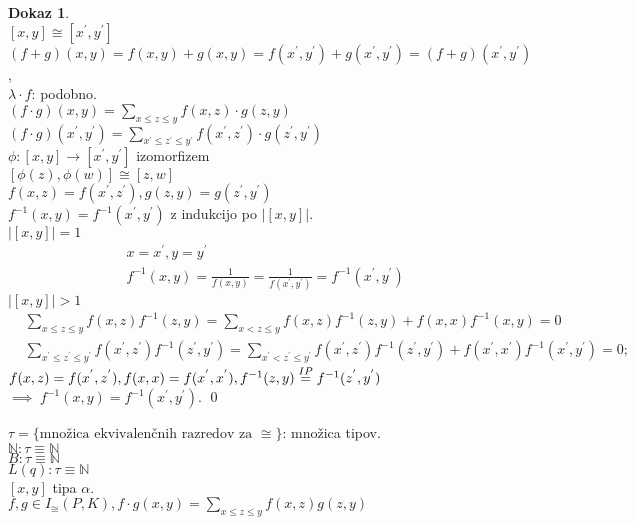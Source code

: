 \documentclass[a4paper, 12pt]{book}
\theoremstyle{definition}
\newtheorem{pro}[counter]{Dokaz}
\theoremstyle{remark}
\newcommand{\N}{\mathbb{N}}
\begin{document}
\begin{pro} \text{} \\
  $[x, y] \cong [x^{'}, y^{'}]$ \\
  $(f+g)(x,y) = f(x,y) + g(x,y) = f(x^{'}, y^{'}) + g(x^{'}, y^{'}) = (f+g)(x^{'}, y^{'})$, \\
  $\lambda \cdot f$: podobno. \\
  $(f \cdot g) (x, y) = \sum_{x \leq z \leq y} f(x, z) \cdot g(z, y)$ \\
  $(f \cdot g) (x^{'}, y^{'}) = \sum_{x^{'} \leq z^{'} \leq y^{'}} f(x^{'}, z^{'}) \cdot g(z^{'}, y^{'})$ \\
  $\phi: [x, y] \to [x^{'}, y^{'}]$ izomorfizem \\
  $[\phi(z), \phi(w)] \cong [z, w]$ \\
  $f(x, z) = f(x^{'}, z^{'}), g(z, y) = g(z^{'}, y^{'})$ \\
  $f^{-1}(x,y) = f^{-1}(x^{'}, y^{'})$ z indukcijo po $\left|[x,y]\right|$. \\
  $\left|[x,y]\right| = 1$
  \begin{align*}
    &x = x^{'}, y = y^{'} \\
    &f^{-1}(x,y) = \frac{1}{f(x,y)} = \frac{1}{f(x^{'}, y^{'})} = f^{-1}(x^{'}, y^{'})
  \end{align*}
  $\left|[x,y]\right| > 1$
  \begin{align*}
    &\sum_{x \leq z \leq y} f(x,z) f^{-1}(z,y) = \sum_{x < z \leq y} f(x,z) f^{-1}(z,y) + f(x,x) f^{-1}(x,y) = 0 \\
    &\sum_{x^{'} \leq z^{'} \leq y^{'}} f(x^{'},z^{'}) f^{-1}(z^{'},y^{'}) =
      \sum_{x^{'} < z^{'} \leq y^{'}} f(x^{'},z^{'}) f^{-1}(z^{'},y^{'}) + f(x^{'},x^{'}) f^{-1}(x^{'},y^{'}) = 0;
  \end{align*}
  $f(x, z) = f(x^{'}, z^{'}), \\
  f(x, x) = f(x^{'}, x^{'}), \\
  f^{-1}(z,y) \stackrel{IP}{=} f^{-1}(z^{'}, y^{'})$ \\
  $\implies \; f^{-1}(x,y) = f^{-1}(x^{'}, y^{'})$.
  \qed
\end{pro}
$\tau = \{\text{množica ekvivalenčnih razredov za } \cong\}$: množica tipov. \\
$\N: \tau \equiv \N$ \\
$B: \tau \equiv \N$ \\
$L(q): \tau \equiv \N$ \\
$[x,y]$ tipa $\alpha$. \\
$f,g \in I_{\cong}(P, K), f \cdot g(x, y) = \sum_{x \leq z \leq y} f(x, z) g(z, y)$ \\
\end{document}
